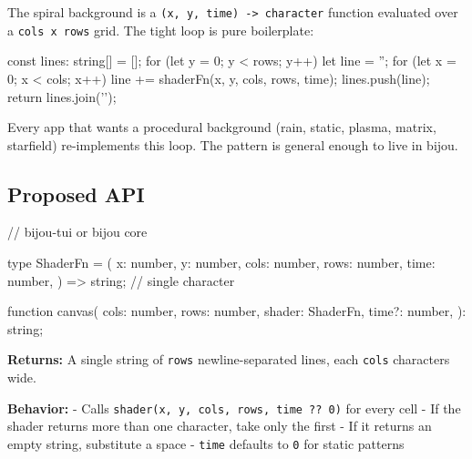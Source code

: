 The spiral background is a \texttt{(\allowbreak{}x\allowbreak{},\allowbreak{} \allowbreak{}y\allowbreak{},\allowbreak{} \allowbreak{}t\allowbreak{}i\allowbreak{}m\allowbreak{}e\allowbreak{})\allowbreak{} \allowbreak{}-\allowbreak{}>\allowbreak{} \allowbreak{}c\allowbreak{}h\allowbreak{}a\allowbreak{}r\allowbreak{}a\allowbreak{}c\allowbreak{}t\allowbreak{}e\allowbreak{}r} function evaluated over a \texttt{c\allowbreak{}o\allowbreak{}l\allowbreak{}s\allowbreak{} \allowbreak{}x\allowbreak{} \allowbreak{}r\allowbreak{}o\allowbreak{}w\allowbreak{}s} grid. The tight loop is pure boilerplate:

\begin{CodeBlock}
const lines: string[] = [];
for (let y = 0; y < rows; y++) {
  let line = '';
  for (let x = 0; x < cols; x++) {
    line += shaderFn(x, y, cols, rows, time);
  }
  lines.push(line);
}
return lines.join('\n');
\end{CodeBlock}

Every app that wants a procedural background (rain, static, plasma, matrix, starfield) re-implements this loop. The pattern is general enough to live in bijou.

\subsection{Proposed API}\label{record-016-proposed-api}

\begin{CodeBlock}
// bijou-tui or bijou core

type ShaderFn = (
  x: number,
  y: number,
  cols: number,
  rows: number,
  time: number,
) => string; // single character

function canvas(
  cols: number,
  rows: number,
  shader: ShaderFn,
  time?: number,
): string;
\end{CodeBlock}

\textbf{Returns:} A single string of \texttt{r\allowbreak{}o\allowbreak{}w\allowbreak{}s} newline-separated lines, each \texttt{c\allowbreak{}o\allowbreak{}l\allowbreak{}s} characters wide.

\textbf{Behavior:} - Calls \texttt{s\allowbreak{}h\allowbreak{}a\allowbreak{}d\allowbreak{}e\allowbreak{}r\allowbreak{}(\allowbreak{}x\allowbreak{},\allowbreak{} \allowbreak{}y\allowbreak{},\allowbreak{} \allowbreak{}c\allowbreak{}o\allowbreak{}l\allowbreak{}s\allowbreak{},\allowbreak{} \allowbreak{}r\allowbreak{}o\allowbreak{}w\allowbreak{}s\allowbreak{},\allowbreak{} \allowbreak{}t\allowbreak{}i\allowbreak{}m\allowbreak{}e\allowbreak{} \allowbreak{}?\allowbreak{}?\allowbreak{} \allowbreak{}0\allowbreak{})} for every cell - If the shader returns more than one character, take only the first - If it returns an empty string, substitute a space - \texttt{t\allowbreak{}i\allowbreak{}m\allowbreak{}e} defaults to \texttt{0} for static patterns

